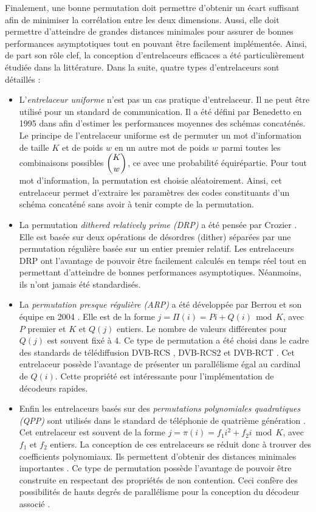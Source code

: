 Finalement, une bonne permutation doit permettre d'obtenir un écart suffisant afin de minimiser la corrélation entre les deux dimensions. Aussi, elle doit permettre d'atteindre de grandes distances minimales pour assurer de bonnes performances asymptotiques tout en pouvant être facilement implémentée. Ainsi, de part son rôle clef, la conception  d'entrelaceurs efficaces a été particulièrement étudiée dans la littérature. Dans la suite, quatre types d'entrelaceurs sont détaillés :
\begin{itemize}
	\item L'\emph{entrelaceur uniforme} n'est pas un cas pratique d'entrelaceur. Il ne peut être utilisé pour un standard de communication. Il a été défini par Benedetto en 1995 dans \cite{benedettoAverage} afin d'estimer les performances moyennes des schémas concaténés. Le principe de l'entrelaceur uniforme est de permuter un mot d'information de taille $K$ et de poids $w$ en un autre mot de poids $w$ parmi toutes les combinaisons possibles $\dbinom{K}{w}$, ce avec une probabilité équirépartie. Pour tout mot d'information, la permutation est choisie aléatoirement. Ainsi, cet entrelaceur permet d'extraire les paramètres des codes constituants d'un schéma concaténé sans avoir à tenir compte de la permutation.
	\item La permutation \emph{dithered relatively prime (DRP)} a été pensée par Crozier \cite{crozierDRP}. Elle est basée sur deux opérations de désordres (dither) séparées par une permutation régulière basée sur un entier premier relatif. Les entrelaceurs DRP ont l'avantage de pouvoir être facilement calculés en temps réel tout en permettant d'atteindre de bonnes performances asymptotiques. Néanmoins, ils n'ont jamais été standardisés.
	\item La \emph{permutation presque régulière (ARP)} a été développée par Berrou et son équipe en 2004 \cite{BerrouARP}. Elle est de la forme $j=\Pi(i)=Pi+Q(i)~~\text{mod}~~K$, avec $P$ premier et $K$ et $Q(j)$ entiers. Le nombre de valeurs différentes pour $Q(j)$ est souvent fixé à 4. Ce type de permutation a été choisi dans le cadre des standards de télédiffusion DVB-RCS \cite{dvbrcs},  DVB-RCS2 \cite{dvbrcs2} et  DVB-RCT \cite{dvbrct}. Cet entrelaceur possède l’avantage de présenter un parallélisme égal au cardinal de $Q(i)$. Cette propriété est intéressante pour l'implémentation de décodeurs rapides. 
	\item Enfin les entrelaceurs basés sur des \emph{permutations polynomiales quadratiques (QPP)} \cite{sunQPP} sont utilisés dans le standard de téléphonie de quatrième génération \cite{lte}. Cet entrelaceur est souvent de la forme $j=\pi(i)=f_1 i^2 + f_2 i~~\text{mod}~~K$, avec $f_1$ et $f_2$ entiers. La conception de ces entrelaceurs se réduit donc à trouver des coefficients polynomiaux. Ils permettent d'obtenir des distances minimales importantes \cite{rosnesQPP}. Ce type de permutation possède l'avantage de pouvoir être construite en respectant des propriétés de non contention. Ceci confère des possibilités de hauts degrés de parallélisme pour la conception du décodeur associé \cite{takeshitaQPP}.  
\end{itemize}
